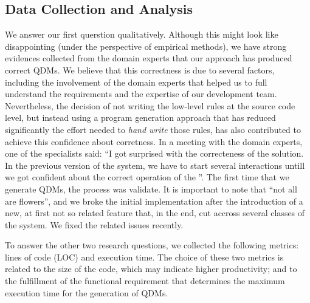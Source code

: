 

\subsection{Data Collection and Analysis}

We answer our first querstion qualitatively. Although this might look like disappointing (under the 
perspective of empirical methods), we have strong evidences collected from the domain experts 
that our approach has produced correct QDMs. We believe that this correctness is due to several 
factors, including the involvement of the domain experts that helped us to full understand 
the requirements and the expertise of our development team. Nevertheless, the decision of 
not writing the low-level rules at the source code level, but instead using a program 
generation approach that has reduced significantly the effort needed to \emph{hand write} 
those rules, has also contributed to achieve this confidence about corretness. In a meeting 
with the domain experts, one of the specialists said: ``I got surprised with the 
correcteness of the solution. In the previous version of the system, we have to start several 
interactions untill we got confident about the correct operation of the \callers''. The first 
time that we generate QDMs, the process was validate. It is important to note that ``not all 
are flowers'', and we broke the initial implementation after the introduction of a new, 
at first not so related feature that, in the end, cut accross several classes of 
the system. We fixed the related issues recently.  

To answer the other two research questions, we collected the following metrics: lines of code (LOC) and execution time. The choice of these 
two metrics is related to the size of the code, which may indicate higher productivity; and to the fulfillment of the 
functional requirement that determines the maximum execution time for the generation of QDMs.

